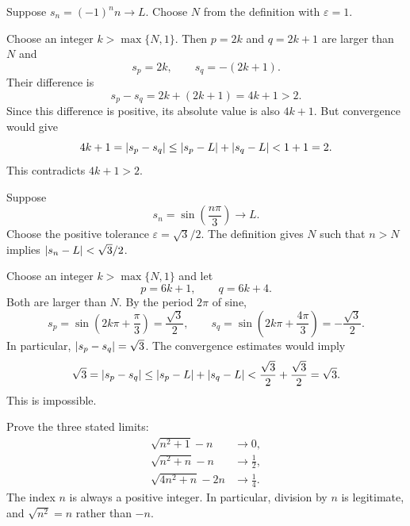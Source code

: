 
Suppose $s_n=(-1)^n n\to L$.
Choose $N$ from the definition with $\varepsilon=1$.

Choose an integer $k>\max\{N,1\}$.
Then $p=2k$ and $q=2k+1$ are larger than $N$ and
\[
 s_p=2k,\qquad s_q=-(2k+1).
\]
Their difference is
\[
 s_p-s_q=2k+(2k+1)=4k+1>2.
\]
Since this difference is positive, its absolute value is also $4k+1$.
But convergence would give
\[
 4k+1
 =\left|s_p-s_q\right|
 \le\left|s_p-L\right|+\left|s_q-L\right|
 <1+1=2.
\]
This contradicts $4k+1>2$.


Suppose
\[
 s_n=\sin\left(\frac{n\pi}{3}\right)\to L.
\]
Choose the positive tolerance $\varepsilon=\sqrt3/2$.
The definition gives $N$ such that $n>N$ implies
$\left|s_n-L\right|<\sqrt3/2$.

Choose an integer $k>\max\{N,1\}$ and let
\[
 p=6k+1,\qquad q=6k+4.
\]
Both are larger than $N$. By the period $2\pi$ of sine,
\[
 s_p=\sin\left(2k\pi+\frac{\pi}{3}\right)=\frac{\sqrt3}{2},
 \qquad
 s_q=\sin\left(2k\pi+\frac{4\pi}{3}\right)=-\frac{\sqrt3}{2}.
\]
In particular, $\left|s_p-s_q\right|=\sqrt3$.
The convergence estimates would imply
\[
 \sqrt3
 =\left|s_p-s_q\right|
 \le\left|s_p-L\right|+\left|s_q-L\right|
 <\frac{\sqrt3}{2}+\frac{\sqrt3}{2}
 =\sqrt3.
\]
This is impossible.



\goal Prove the three stated limits:
\begin{align*}
 \sqrt{n^2+1}-n&\longrightarrow0,\\
 \sqrt{n^2+n}-n&\longrightarrow\frac12,\\
 \sqrt{4n^2+n}-2n&\longrightarrow\frac14.
\end{align*}
The index $n$ is always a positive integer. In particular, division by
$n$ is legitimate, and $\sqrt{n^2}=n$ rather than $-n$.

